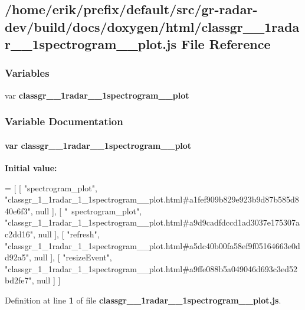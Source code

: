\subsection{/home/erik/prefix/default/src/gr-\/radar-\/dev/build/docs/doxygen/html/classgr\+\_\+\_\+1radar\+\_\+\_\+1spectrogram\+\_\+\+\_\+plot.js File Reference}
\label{classgr__1__1radar__1__1spectrogram____plot_8js}
\subsubsection*{Variables}
\begin{DoxyCompactItemize}
\item 
var {\bf classgr\+\_\+\_\+1radar\+\_\+\_\+1spectrogram\+\_\+\+\_\+plot}
\end{DoxyCompactItemize}


\subsubsection{Variable Documentation}
\paragraph[{classgr\+\_\+1\+\_\+1radar\+\_\+1\+\_\+1spectrogram\+\_\+\+\_\+plot}]{\setlength{\rightskip}{0pt plus 5cm}var classgr\+\_\+\_\+1radar\+\_\+\_\+1spectrogram\+\_\+\+\_\+plot}\label{classgr__1__1radar__1__1spectrogram____plot_8js_ad86e556804b01a76613a1c25d5fcc05c}
{\bfseries Initial value\+:}
\begin{DoxyCode}
=
[
    [ \textcolor{stringliteral}{"spectrogram\_plot"}, \textcolor{stringliteral}{"classgr\_1\_1radar\_1\_1spectrogram\_\_plot.html#a1fef909b829e923b9d87b585d840e6f3"}, 
      null ],
    [ \textcolor{stringliteral}{"~spectrogram\_plot"}, \textcolor{stringliteral}{"classgr\_1\_1radar\_1\_1spectrogram\_\_plot.html#a9d9cadfdccd1ad3037e175307ac2dd16"}, 
      null ],
    [ \textcolor{stringliteral}{"refresh"}, \textcolor{stringliteral}{"classgr\_1\_1radar\_1\_1spectrogram\_\_plot.html#a5dc40b00fa58ef9f05164663e0dd92a5"}, null ],
    [ \textcolor{stringliteral}{"resizeEvent"}, \textcolor{stringliteral}{"classgr\_1\_1radar\_1\_1spectrogram\_\_plot.html#a9ffe088b5a049046d693c3ed52bd2fe7"}, null ]
]
\end{DoxyCode}


Definition at line {\bf 1} of file {\bf classgr\+\_\+\_\+1radar\+\_\+\_\+1spectrogram\+\_\+\+\_\+plot.\+js}.

